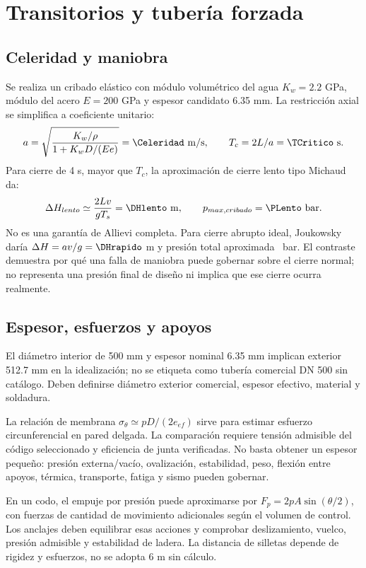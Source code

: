 \section{Transitorios y tubería forzada}
\subsection{Celeridad y maniobra}
Se realiza un cribado elástico con módulo volumétrico del agua $K_w=2.2$ GPa, módulo del acero $E=200$ GPa y espesor candidato 6.35 mm. La restricción axial se simplifica a coeficiente unitario:
\[
a=\sqrt{\frac{K_w/\rho}{1+K_wD/(Ee)}}=\Celeridad\ \mathrm{m/s},\qquad
T_c=2L/a=\TCritico\ \mathrm{s}.
\]
Para cierre de 4 s, mayor que $T_c$, la aproximación de cierre lento tipo Michaud da:
\[
\Delta H_{lento}\simeq\frac{2Lv}{gT_s}=\DHlento\ \mathrm{m},\qquad
p_{max,cribado}=\PLento\ \mathrm{bar}.
\]
No es una garantía de Allievi completa. Para cierre abrupto ideal, Joukowsky daría $\Delta H=av/g=\DHrapido$ m y presión total aproximada \PRapido\ bar. El contraste demuestra por qué una falla de maniobra puede gobernar sobre el cierre normal; no representa una presión final de diseño ni implica que ese cierre ocurra realmente.


\subsection{Espesor, esfuerzos y apoyos}
El diámetro interior de 500 mm y espesor nominal 6.35 mm implican exterior 512.7 mm en la idealización; no se etiqueta como tubería comercial DN 500 sin catálogo. Deben definirse diámetro exterior comercial, espesor efectivo, material y soldadura.

La relación de membrana $\sigma_\theta\simeq pD/(2e_{ef})$ sirve para estimar esfuerzo circunferencial en pared delgada. La comparación requiere tensión admisible del código seleccionado y eficiencia de junta verificadas. No basta obtener un espesor pequeño: presión externa/vacío, ovalización, estabilidad, peso, flexión entre apoyos, térmica, transporte, fatiga y sismo pueden gobernar.

En un codo, el empuje por presión puede aproximarse por $F_p=2pA\sin(\theta/2)$, con fuerzas de cantidad de movimiento adicionales según el volumen de control. Los anclajes deben equilibrar esas acciones y comprobar deslizamiento, vuelco, presión admisible y estabilidad de ladera. La distancia de silletas depende de rigidez y esfuerzos, no se adopta 6 m sin cálculo.

